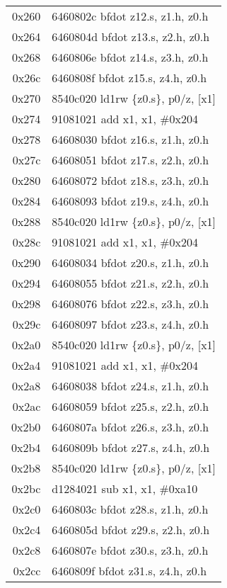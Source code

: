 \documentclass[11pt,a4paper]{article}
\begin{document}
\begin{longtable}{|r|l|}
\rowcolor{computation} 0x260 & 6460802c \quad bfdot z12.s, z1.h, z0.h \\
\rowcolor{computation} 0x264 & 6460804d \quad bfdot z13.s, z2.h, z0.h \\
\rowcolor{computation} 0x268 & 6460806e \quad bfdot z14.s, z3.h, z0.h \\
\rowcolor{computation} 0x26c & 6460808f \quad bfdot z15.s, z4.h, z0.h \\
\rowcolor{matrixload} 0x270 & 8540c020 \quad ld1rw \{z0.s\}, p0/z, [x1] \\
\rowcolor{address} 0x274 & 91081021 \quad add x1, x1, \#0x204 \\
\rowcolor{computation} 0x278 & 64608030 \quad bfdot z16.s, z1.h, z0.h \\
\rowcolor{computation} 0x27c & 64608051 \quad bfdot z17.s, z2.h, z0.h \\
\rowcolor{computation} 0x280 & 64608072 \quad bfdot z18.s, z3.h, z0.h \\
\rowcolor{computation} 0x284 & 64608093 \quad bfdot z19.s, z4.h, z0.h \\
\rowcolor{matrixload} 0x288 & 8540c020 \quad ld1rw \{z0.s\}, p0/z, [x1] \\
\rowcolor{address} 0x28c & 91081021 \quad add x1, x1, \#0x204 \\
\rowcolor{computation} 0x290 & 64608034 \quad bfdot z20.s, z1.h, z0.h \\
\rowcolor{computation} 0x294 & 64608055 \quad bfdot z21.s, z2.h, z0.h \\
\rowcolor{computation} 0x298 & 64608076 \quad bfdot z22.s, z3.h, z0.h \\
\rowcolor{computation} 0x29c & 64608097 \quad bfdot z23.s, z4.h, z0.h \\
\rowcolor{matrixload} 0x2a0 & 8540c020 \quad ld1rw \{z0.s\}, p0/z, [x1] \\
\rowcolor{address} 0x2a4 & 91081021 \quad add x1, x1, \#0x204 \\
\rowcolor{computation} 0x2a8 & 64608038 \quad bfdot z24.s, z1.h, z0.h \\
\rowcolor{computation} 0x2ac & 64608059 \quad bfdot z25.s, z2.h, z0.h \\
\rowcolor{computation} 0x2b0 & 6460807a \quad bfdot z26.s, z3.h, z0.h \\
\rowcolor{computation} 0x2b4 & 6460809b \quad bfdot z27.s, z4.h, z0.h \\
\rowcolor{matrixload} 0x2b8 & 8540c020 \quad ld1rw \{z0.s\}, p0/z, [x1] \\
\rowcolor{address} 0x2bc & d1284021 \quad sub x1, x1, \#0xa10 \\
\rowcolor{computation} 0x2c0 & 6460803c \quad bfdot z28.s, z1.h, z0.h \\
\rowcolor{computation} 0x2c4 & 6460805d \quad bfdot z29.s, z2.h, z0.h \\
\rowcolor{computation} 0x2c8 & 6460807e \quad bfdot z30.s, z3.h, z0.h \\
\rowcolor{computation} 0x2cc & 6460809f \quad bfdot z31.s, z4.h, z0.h \\


\end{longtable}
\end{document}
